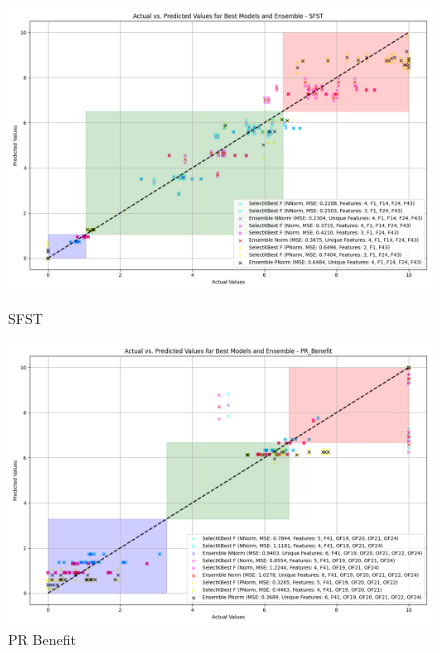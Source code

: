 \begin{figure}[H]
    \centering
    \begin{minipage}{0.45\textwidth}
        \centering
        \includegraphics[width=\linewidth]{reg_section_specific/featred_ensemble_learning/actual_vs_predicted_best_feature_selection_and_ensemble_SFST_10.png}
        \caption{SFST}
        \label{reg_spec_fig:sfst_featred}
    \end{minipage}\hfill
    \begin{minipage}{0.45\textwidth}
        \centering
        \includegraphics[width=\linewidth]{reg_section_specific/featred_ensemble_learning/actual_vs_predicted_best_feature_selection_and_ensemble_PR_Benefit_10.png}
        \caption{PR Benefit}
        \label{reg_spec_fig:pr_ben_featred}
    \end{minipage}
\end{figure}

